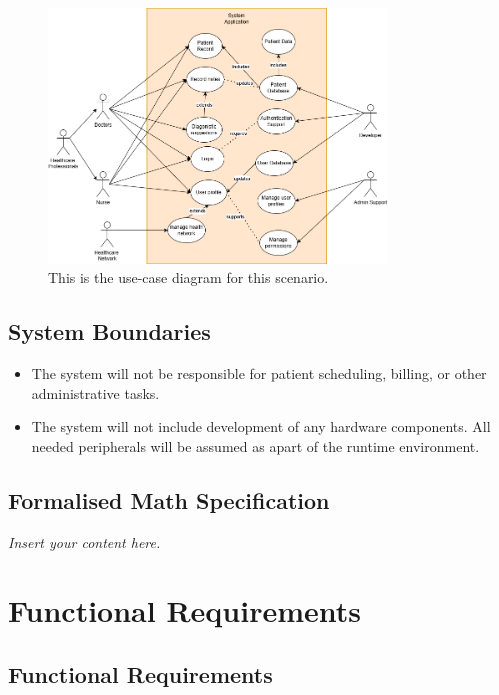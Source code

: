 \documentclass[12pt]{article}
\newcommand{\lips}{\textit{Insert your content here.}}
\begin{document}
\begin{figure}[H]
  \includegraphics[width=0.8\textwidth]{use-case.drawio.png}
  \caption{This is the use-case diagram for this scenario.}
  \label{fig:Use-Case Diagram}
\end{figure}

\subsection{System Boundaries}
\begin{itemize}
  \item The system will not be responsible for patient scheduling, billing, or other administrative tasks.
  \item The system will not include development of any hardware components. All needed peripherals will be assumed as apart of the runtime environment.
\end{itemize}

\subsection{Formalised Math Specification}
\lips

\section{Functional Requirements}
\subsection{Functional Requirements}
\end{document}
